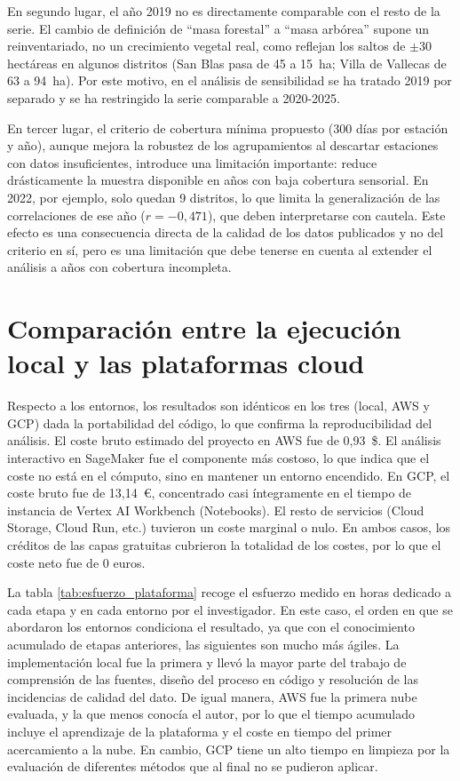 En segundo lugar, el año 2019 no es directamente comparable con el resto de la serie. El cambio de definición de ``masa forestal'' a ``masa arbórea'' supone un reinventariado, no un crecimiento vegetal real, como reflejan los saltos de $\pm30$ hectáreas en algunos distritos (San Blas pasa de 45 a 15~ha; Villa de Vallecas de 63 a 94~ha). Por este motivo, en el análisis de sensibilidad se ha tratado 2019 por separado y se ha restringido la serie comparable a 2020-2025.

En tercer lugar, el criterio de cobertura mínima propuesto (300 días por estación y año), aunque mejora la robustez de los agrupamientos al descartar estaciones con datos insuficientes, introduce una limitación importante: reduce drásticamente la muestra disponible en años con baja cobertura sensorial. En 2022, por ejemplo, solo quedan 9 distritos, lo que limita la generalización de las correlaciones de ese año ($r = -0,471$), que deben interpretarse con cautela. Este efecto es una consecuencia directa de la calidad de los datos publicados y no del criterio en sí, pero es una limitación que debe tenerse en cuenta al extender el análisis a años con cobertura incompleta.

\section{Comparación entre la ejecución local y las plataformas cloud}
\label{sec:Resultados_cloud}

Respecto a los entornos, los resultados son idénticos en los tres (local, AWS y GCP) dada la portabilidad del código, lo que confirma la reproducibilidad del análisis. El coste bruto estimado del proyecto en AWS fue de 0,93~\$. El análisis interactivo en SageMaker fue el componente más costoso, lo que indica que el coste no está en el cómputo, sino en mantener un entorno encendido. En GCP, el coste bruto fue de 13,14~€, concentrado casi íntegramente en el tiempo de instancia de Vertex AI Workbench (Notebooks). El resto de servicios (Cloud Storage, Cloud Run, etc.) tuvieron un coste marginal o nulo.
En ambos casos, los créditos de las capas gratuitas cubrieron la totalidad de los costes, por lo que el coste neto fue de 0 euros.

La tabla \ref{tab:esfuerzo_plataforma} recoge el esfuerzo medido en horas dedicado a cada etapa y en cada entorno por el investigador. En este caso, el orden en que se abordaron los entornos condiciona el resultado, ya que con el conocimiento acumulado de etapas anteriores, las siguientes son mucho más ágiles. La implementación local fue la primera y llevó la mayor parte del trabajo de comprensión de las fuentes, diseño del proceso en código y resolución de las incidencias de calidad del dato. De igual manera, AWS fue la primera nube evaluada, y la que menos conocía el autor, por lo que el tiempo acumulado incluye el aprendizaje de la plataforma y el coste en tiempo del primer acercamiento a la nube. En cambio, GCP tiene un alto tiempo en limpieza por la evaluación de diferentes métodos que al final no se pudieron aplicar.

